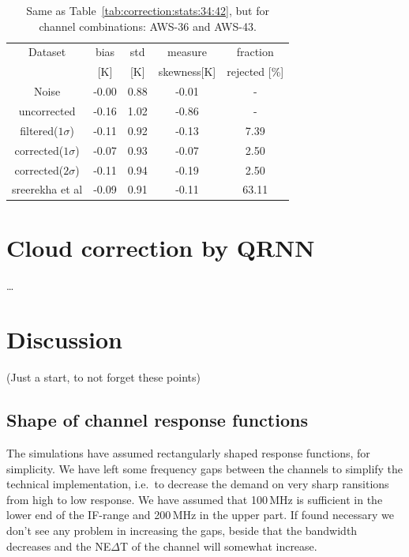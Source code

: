 \documentclass[12pt]{article}
\begin{document}
\begin{table}[!bt]
	\centering
	\begin{tabular}[b]{c|c|c|c|c}
		Dataset  		  &   bias &   std &   measure & fraction  \\
							&   [K]  &   [K] & skewness[K] & rejected [\%]\\
		\hline
 Noise            	 &  -0.00 &  0.88 &              -0.01 &               - \\
uncorrected      	 &  -0.16 &  1.02 &              -0.86 &                - \\
filtered($1\sigma$)  &  -0.11 &  0.92 &              -0.13 &                7.39 \\
corrected($1\sigma$) &  -0.07 &  0.93 &              -0.07 &                2.50 \\
corrected($2\sigma$) &  -0.11 &  0.94 &              -0.19 &                2.50 \\
sreerekha et al 	 &  -0.09 &  0.91 &              -0.11 &               63.11 \\
		\hline
	\end{tabular}
	\caption{Same as Table~\ref{tab:correction:stats:34:42}, but for channel combinations: AWS-36 and AWS-43.   }
	\label{tab:correction:stats:36:43}
\end{table}


\section{Cloud correction by QRNN}
%
\dots


\section{Discussion}

(Just a start, to not forget these points)

\subsection{Shape of channel response functions}
%
The simulations have assumed rectangularly shaped response functions, for
simplicity. We have left some frequency gaps between the channels to simplify
the technical implementation, i.e.\ to decrease the demand on very sharp
ransitions from high to low response. We have assumed that 100\,MHz is
sufficient in the lower end of the IF-range and 200\,MHz in the upper part. If
found necessary we don't see any problem in increasing the gaps, beside that
the bandwidth decreases and the NE$\Delta$T of the channel will somewhat
increase.
\end{document}
